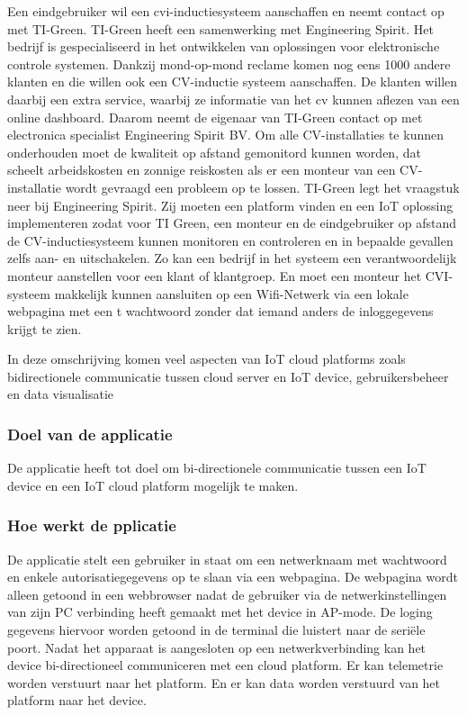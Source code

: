 Een eindgebruiker wil een cvi-inductiesysteem aanschaffen en neemt contact op met TI-Green. TI-Green heeft een samenwerking met Engineering Spirit. Het bedrijf is gespecialiseerd in het ontwikkelen van oplossingen voor elektronische controle systemen. Dankzij mond-op-mond reclame komen nog eens 1000 andere klanten en die willen ook een CV-inductie systeem aanschaffen. De klanten willen daarbij een extra service, waarbij ze informatie van het cv kunnen aflezen van een online dashboard. Daarom neemt de eigenaar van TI-Green contact op met electronica specialist Engineering Spirit BV. Om alle CV-installaties te kunnen onderhouden moet de kwaliteit op afstand gemonitord kunnen worden, dat scheelt arbeidskosten en zonnige reiskosten als er een monteur van een CV-installatie wordt gevraagd een probleem op te lossen. TI-Green legt het vraagstuk neer bij Engineering Spirit. Zij moeten een platform vinden en een IoT oplossing implementeren zodat voor TI Green, een monteur en de eindgebruiker op afstand de CV-inductiesysteem kunnen monitoren en controleren en in bepaalde gevallen zelfs aan- en uitschakelen. Zo kan een bedrijf in het systeem een verantwoordelijk monteur aanstellen voor een klant of klantgroep. En moet een monteur het CVI-systeem makkelijk kunnen aansluiten op een Wifi-Netwerk via een lokale webpagina met een t wachtwoord zonder dat iemand anders de inloggegevens krijgt te zien.


In deze omschrijving komen veel aspecten van IoT cloud platforms zoals bidirectionele communicatie tussen cloud server en IoT device, gebruikersbeheer en data visualisatie

\subsubsection{Doel van de applicatie}
De applicatie heeft tot doel om bi-directionele communicatie tussen een IoT device en een IoT cloud platform mogelijk te maken.

\subsubsection{Hoe werkt de pplicatie}
De applicatie stelt een gebruiker in staat om een netwerknaam met wachtwoord en enkele autorisatiegegevens op te slaan via een webpagina. De webpagina wordt alleen getoond in een webbrowser nadat de gebruiker via de netwerkinstellingen van zijn PC verbinding heeft gemaakt met het device in AP-mode. De loging gegevens hiervoor worden getoond in de terminal die luistert naar de seriële poort. Nadat het apparaat is aangesloten op een netwerkverbinding kan het device bi-directioneel communiceren met een cloud platform. Er kan telemetrie worden verstuurt naar het platform. En er kan data worden verstuurd van het platform naar het device.



